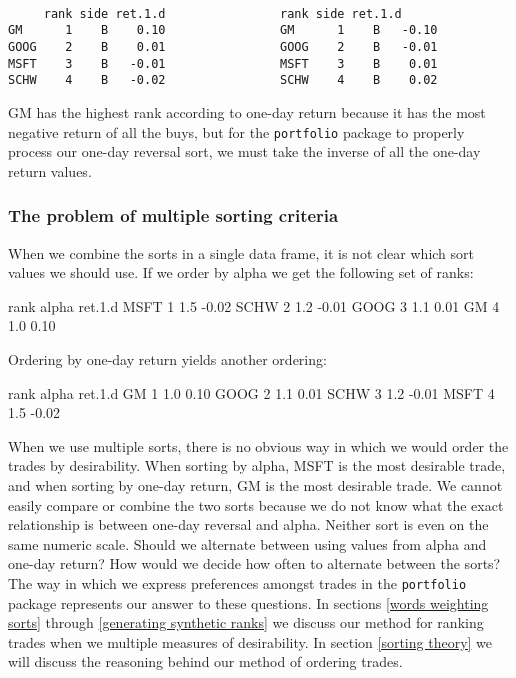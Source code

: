 \documentclass{article}
\begin{document}
\begin{verbatim}

     rank side ret.1.d                rank side ret.1.d
GM      1    B    0.10                GM      1    B   -0.10
GOOG    2    B    0.01                GOOG    2    B   -0.01
MSFT    3    B   -0.01                MSFT    3    B    0.01
SCHW    4    B   -0.02                SCHW    4    B    0.02

\end{verbatim}


GM has the highest rank according to one-day return
because it has the most negative return of all the buys, but for the
\texttt{portfolio} package to properly process our one-day reversal
sort, we must take the inverse of all the one-day return values.

\subsubsection{The problem of multiple sorting criteria}

When we combine the sorts in a single data frame, it is not clear
which sort values we should use. If we order by alpha we get the
following set of ranks:

\begin{Schunk}
\begin{Soutput}
     rank alpha ret.1.d
MSFT    1   1.5   -0.02
SCHW    2   1.2   -0.01
GOOG    3   1.1    0.01
GM      4   1.0    0.10
\end{Soutput}
\end{Schunk}

Ordering by one-day return yields another ordering:

\begin{Schunk}
\begin{Soutput}
     rank alpha ret.1.d
GM      1   1.0    0.10
GOOG    2   1.1    0.01
SCHW    3   1.2   -0.01
MSFT    4   1.5   -0.02
\end{Soutput}
\end{Schunk}

When we use multiple sorts, there is no obvious way in which we would
order the trades by desirability.  When sorting by alpha,
MSFT is the most desirable trade, and when
sorting by one-day return, GM is the most
desirable trade.  We cannot easily compare or combine the two sorts
because we do not know what the exact relationship is between one-day
reversal and alpha.  Neither sort is even on the same numeric scale.
Should we alternate between using values from alpha and one-day
return?  How would we decide how often to alternate between the sorts?
The way in which we express preferences amongst trades in the
\texttt{portfolio} package represents our answer to these questions.
In sections \ref{words weighting sorts} through \ref{generating
synthetic ranks} we discuss our method for ranking trades when we
multiple measures of desirability.  In section \ref{sorting theory} we
will discuss the reasoning behind our method of ordering trades.
\end{document}

